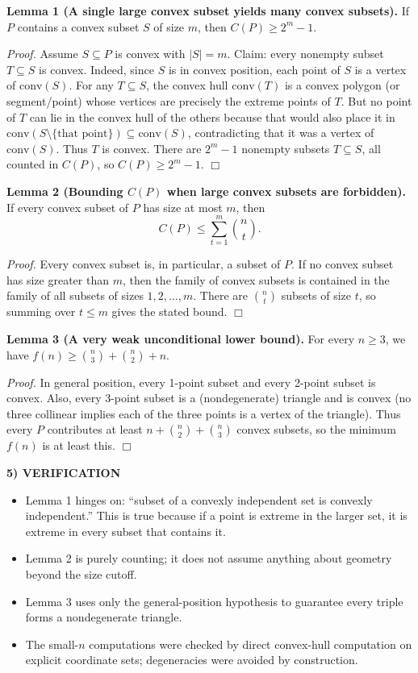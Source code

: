 \medskip
\noindent\textbf{Lemma 1 (A single large convex subset yields many convex subsets).}
If $P$ contains a convex subset $S$ of size $m$, then $C(P)\ge 2^m-1$.

\noindent\emph{Proof.}
Assume $S\subseteq P$ is convex with $|S|=m$.
Claim: every nonempty subset $T\subseteq S$ is convex.
Indeed, since $S$ is in convex position, each point of $S$ is a vertex of $\mathrm{conv}(S)$.
For any $T\subseteq S$, the convex hull $\mathrm{conv}(T)$ is a convex polygon (or segment/point) whose vertices are precisely the extreme points of $T$.
But no point of $T$ can lie in the convex hull of the others because that would also place it in $\mathrm{conv}(S\setminus\{\text{that point}\})\subseteq\mathrm{conv}(S)$, contradicting that it was a vertex of $\mathrm{conv}(S)$.
Thus $T$ is convex.
There are $2^m-1$ nonempty subsets $T\subseteq S$, all counted in $C(P)$, so $C(P)\ge 2^m-1$. \hfill$\Box$

\medskip
\noindent\textbf{Lemma 2 (Bounding $C(P)$ when large convex subsets are forbidden).}
If every convex subset of $P$ has size at most $m$, then
\[
C(P)\le \sum_{t=1}^{m} \binom{n}{t}.
\]

\noindent\emph{Proof.}
Every convex subset is, in particular, a subset of $P$.
If no convex subset has size greater than $m$, then the family of convex subsets is contained in the family of all subsets of sizes $1,2,\dots,m$.
There are $\binom{n}{t}$ subsets of size $t$, so summing over $t\le m$ gives the stated bound. \hfill$\Box$

\medskip
\noindent\textbf{Lemma 3 (A very weak unconditional lower bound).}
For every $n\ge 3$, we have $f(n)\ge \binom{n}{3}+\binom{n}{2}+n$.

\noindent\emph{Proof.}
In general position, every 1-point subset and every 2-point subset is convex.
Also, every 3-point subset is a (nondegenerate) triangle and is convex (no three collinear implies each of the three points is a vertex of the triangle).
Thus every $P$ contributes at least $n+\binom{n}{2}+\binom{n}{3}$ convex subsets, so the minimum $f(n)$ is at least this. \hfill$\Box$

\medskip
\noindent\textbf{5) VERIFICATION}

\begin{itemize}
\item Lemma 1 hinges on: ``subset of a convexly independent set is convexly independent.'' This is true because if a point is extreme in the larger set, it is extreme in every subset that contains it.
\item Lemma 2 is purely counting; it does not assume anything about geometry beyond the size cutoff.
\item Lemma 3 uses only the general-position hypothesis to guarantee every triple forms a nondegenerate triangle.
\item The small-$n$ computations were checked by direct convex-hull computation on explicit coordinate sets; degeneracies were avoided by construction.
\end{itemize}

